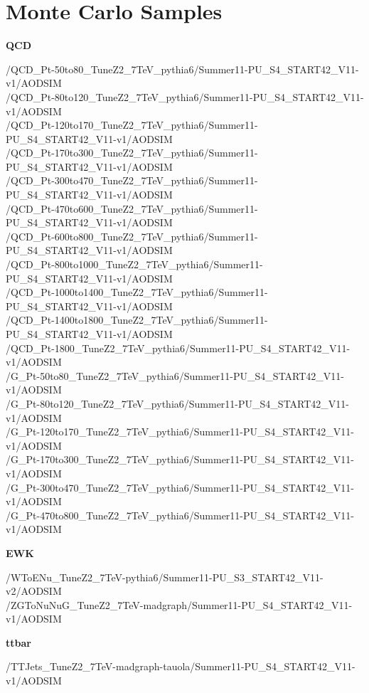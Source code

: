\chapter{Monte Carlo Samples}

{\bf QCD}

{\scriptsize

/QCD\_Pt-50to80\_TuneZ2\_7TeV\_pythia6/Summer11-PU\_S4\_START42\_V11-v1/AODSIM\\
/QCD\_Pt-80to120\_TuneZ2\_7TeV\_pythia6/Summer11-PU\_S4\_START42\_V11-v1/AODSIM\\
/QCD\_Pt-120to170\_TuneZ2\_7TeV\_pythia6/Summer11-PU\_S4\_START42\_V11-v1/AODSIM\\
/QCD\_Pt-170to300\_TuneZ2\_7TeV\_pythia6/Summer11-PU\_S4\_START42\_V11-v1/AODSIM\\
/QCD\_Pt-300to470\_TuneZ2\_7TeV\_pythia6/Summer11-PU\_S4\_START42\_V11-v1/AODSIM\\
/QCD\_Pt-470to600\_TuneZ2\_7TeV\_pythia6/Summer11-PU\_S4\_START42\_V11-v1/AODSIM\\
/QCD\_Pt-600to800\_TuneZ2\_7TeV\_pythia6/Summer11-PU\_S4\_START42\_V11-v1/AODSIM\\
/QCD\_Pt-800to1000\_TuneZ2\_7TeV\_pythia6/Summer11-PU\_S4\_START42\_V11-v1/AODSIM\\
/QCD\_Pt-1000to1400\_TuneZ2\_7TeV\_pythia6/Summer11-PU\_S4\_START42\_V11-v1/AODSIM\\
/QCD\_Pt-1400to1800\_TuneZ2\_7TeV\_pythia6/Summer11-PU\_S4\_START42\_V11-v1/AODSIM\\
/QCD\_Pt-1800\_TuneZ2\_7TeV\_pythia6/Summer11-PU\_S4\_START42\_V11-v1/AODSIM\\
/G\_Pt-50to80\_TuneZ2\_7TeV\_pythia6/Summer11-PU\_S4\_START42\_V11-v1/AODSIM\\
/G\_Pt-80to120\_TuneZ2\_7TeV\_pythia6/Summer11-PU\_S4\_START42\_V11-v1/AODSIM\\
/G\_Pt-120to170\_TuneZ2\_7TeV\_pythia6/Summer11-PU\_S4\_START42\_V11-v1/AODSIM\\
/G\_Pt-170to300\_TuneZ2\_7TeV\_pythia6/Summer11-PU\_S4\_START42\_V11-v1/AODSIM\\
/G\_Pt-300to470\_TuneZ2\_7TeV\_pythia6/Summer11-PU\_S4\_START42\_V11-v1/AODSIM\\
/G\_Pt-470to800\_TuneZ2\_7TeV\_pythia6/Summer11-PU\_S4\_START42\_V11-v1/AODSIM\\}

{\bf EWK}

{\scriptsize
/WToENu\_TuneZ2\_7TeV-pythia6/Summer11-PU\_S3\_START42\_V11-v2/AODSIM\\
/ZGToNuNuG\_TuneZ2\_7TeV-madgraph/Summer11-PU\_S4\_START42\_V11-v1/AODSIM\\}

{\bf ttbar}

{\scriptsize
/TTJets\_TuneZ2\_7TeV-madgraph-tauola/Summer11-PU\_S4\_START42\_V11-v1/AODSIM} \\

